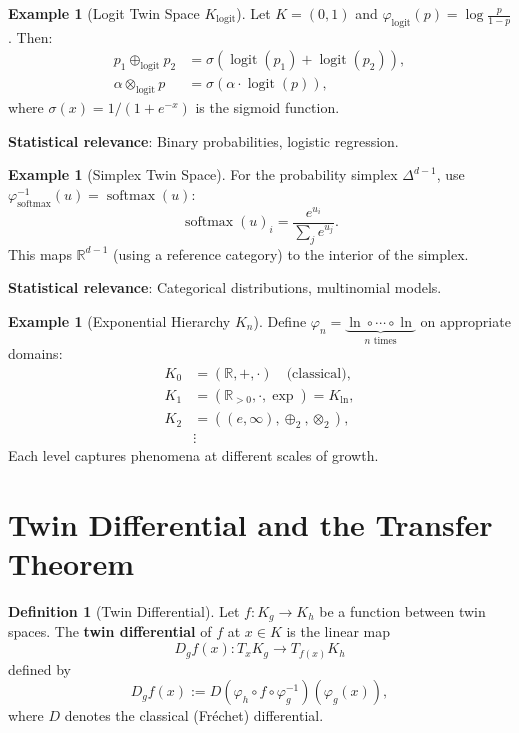 \documentclass[11pt,twoside]{book}
\theoremstyle{plain}
\theoremstyle{definition}
\newtheorem{definition}[theorem]{Definition}
\newtheorem{example}[theorem]{Example}
\theoremstyle{remark}
\newcommand{\R}{\mathbb{R}}
\newcommand{\Kg}{K_g}
\newcommand{\Kln}{K_{\ln}}
\newcommand{\Klogit}{K_{\mathrm{logit}}}
\DeclareMathOperator{\softmax}{softmax}
\DeclareMathOperator{\logit}{logit}
\newcommand{\Dg}{D_g}
\newcommand{\simplex}{\Delta}
\newcommand{\Rpos}{\R_{>0}}
\begin{document}
\begin{example}[Logit Twin Space $\Klogit$]
    \label{ex:logit_twin}
    Let $K = (0,1)$ and $\varphi_{\logit}(p) = \log\frac{p}{1-p}$. Then:
    \begin{align}
        p_1 \oplus_{\logit} p_2 &= \sigma\left(\logit(p_1) + \logit(p_2)\right), \\
        \alpha \otimes_{\logit} p &= \sigma(\alpha \cdot \logit(p)),
    \end{align}
    where $\sigma(x) = 1/(1+e^{-x})$ is the sigmoid function.
    
    \textbf{Statistical relevance}: Binary probabilities, logistic regression.
\end{example}

\begin{example}[Simplex Twin Space]
    \label{ex:simplex_twin}
    For the probability simplex $\simplex^{d-1}$, use $\varphi_{\text{softmax}}^{-1}(u) = \softmax(u)$:
    \[
    \softmax(u)_i = \frac{e^{u_i}}{\sum_j e^{u_j}}.
    \]
    This maps $\R^{d-1}$ (using a reference category) to the interior of the simplex.
    
    \textbf{Statistical relevance}: Categorical distributions, multinomial models.
\end{example}

\begin{example}[Exponential Hierarchy $K_n$]
    \label{ex:exp_hierarchy}
    Define $\varphi_n = \underbrace{\ln \circ \cdots \circ \ln}_{n \text{ times}}$ on appropriate domains:
    \begin{align}
        K_0 &= (\R, +, \cdot) \quad \text{(classical)}, \\
        K_1 &= (\Rpos, \cdot, \exp) = \Kln, \\
        K_2 &= ((e, \infty), \oplus_2, \otimes_2), \\
        &\vdots
    \end{align}
    Each level captures phenomena at different scales of growth.
\end{example}

\section{Twin Differential and the Transfer Theorem}
\label{sec:twin_differential}

\begin{definition}[Twin Differential]
    \label{def:twin_differential}
    Let $f : \Kg \to K_h$ be a function between twin spaces. The \textbf{twin differential} of $f$ at $x \in K$ is the linear map
    \[
    \Dg f(x) : T_x \Kg \to T_{f(x)} K_h
    \]
    defined by
    \[
    \Dg f(x) := D(\varphi_h \circ f \circ \varphi_g^{-1})(\varphi_g(x)),
    \]
    where $D$ denotes the classical (Fréchet) differential.
\end{definition}
\end{document}
